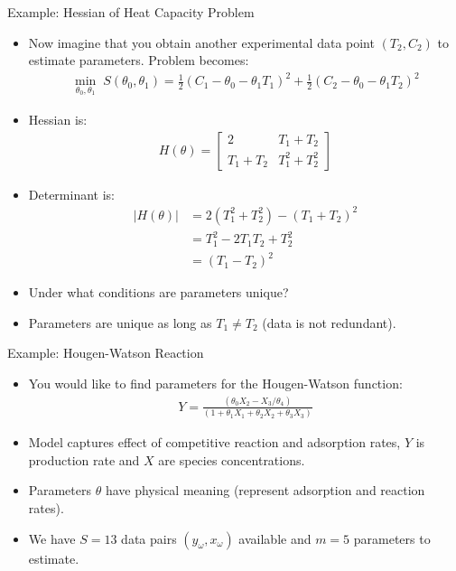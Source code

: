 \documentclass[9pt]{beamer}
\begin{document}
%
\begin{frame}{Example: Hessian of Heat Capacity Problem}

\begin{itemize}
\setlength{\itemsep}{10pt}
\item Now imagine that you obtain another experimental data point $(T_2,C_2)$ to estimate parameters. Problem becomes: 
\begin{align*}
\min_{\theta_0,\theta_1} \; S(\theta_0,\theta_1)=\frac{1}{2}(C_1-\theta_0-\theta_1T_1)^2+\frac{1}{2}(C_2-\theta_0-\theta_1T_2)^2
\end{align*}
\item Hessian is:
\begin{align*}
H(\theta)=\left[\begin{array}{cc}2&T_1+T_2\\ T_1+T_2 & T_1^2+T_2^2\end{array}\right]
\end{align*}
\item Determinant is:
\begin{align*}
|H(\theta)|&=2(T_1^2+T_2^2)-(T_1+T_2)^2\\
&=T_1^2-2T_1T_2+T_2^2\\
&=(T_1-T_2)^2
\end{align*}
\item Under what conditions are parameters unique? 
\pause
\item Parameters are unique as long as $T_1\neq T_2$ (data is not redundant). 
\end{itemize}

\end{frame}


%
\begin{frame}{Example: Hougen-Watson Reaction}

\begin{itemize}
\item You would like to find parameters for the Hougen-Watson function:
\begin{align*}
Y=\frac{(\theta_0X_2-X_3/\theta_4)}{(1+\theta_1X_1+\theta_2X_2+\theta_3X_3)}
\end{align*}
\item Model captures effect of competitive reaction and adsorption rates, $Y$ is production rate and $X$ are species concentrations. 
\item Parameters $\theta$ have physical meaning (represent adsorption and reaction rates). 
\item We have $S=13$ data pairs $(y_\omega,x_\omega)$ available and $m=5$ parameters to estimate. 
\end{itemize}


\end{frame}
\end{document}
